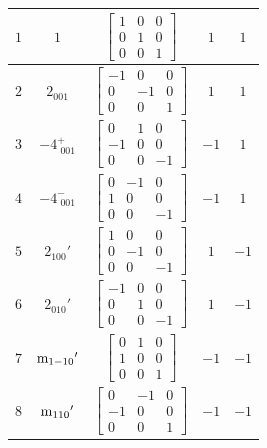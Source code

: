 \documentclass[fleqn,8pt]{jsarticle}
\begin{document}
\begin{longtable}{ccccc}
$ 1 $ & $ 1 $ & $ \begin{bmatrix} 1 & 0 & 0 \\ 0 & 1 & 0 \\ 0 & 0 & 1 \end{bmatrix} $ & $ 1 $ & $ 1 $ \\ \hline
$ 2 $ & $ 2{}_{001} $ & $ \begin{bmatrix} -1 & 0 & 0 \\ 0 & -1 & 0 \\ 0 & 0 & 1 \end{bmatrix} $ & $ 1 $ & $ 1 $ \\ \hline
$ 3 $ & $ -4^{+}_{\,\,001} $ & $ \begin{bmatrix} 0 & 1 & 0 \\ -1 & 0 & 0 \\ 0 & 0 & -1 \end{bmatrix} $ & $ -1 $ & $ 1 $ \\ \hline
$ 4 $ & $ -4^{-}_{\,\,001} $ & $ \begin{bmatrix} 0 & -1 & 0 \\ 1 & 0 & 0 \\ 0 & 0 & -1 \end{bmatrix} $ & $ -1 $ & $ 1 $ \\ \hline
$ 5 $ & $ 2{}_{100}{}' $ & $ \begin{bmatrix} 1 & 0 & 0 \\ 0 & -1 & 0 \\ 0 & 0 & -1 \end{bmatrix} $ & $ 1 $ & $ -1 $ \\ \hline
$ 6 $ & $ 2{}_{010}{}' $ & $ \begin{bmatrix} -1 & 0 & 0 \\ 0 & 1 & 0 \\ 0 & 0 & -1 \end{bmatrix} $ & $ 1 $ & $ -1 $ \\ \hline
$ 7 $ & $ {\rm m}_{1-10}{}' $ & $ \begin{bmatrix} 0 & 1 & 0 \\ 1 & 0 & 0 \\ 0 & 0 & 1 \end{bmatrix} $ & $ -1 $ & $ -1 $ \\ \hline
$ 8 $ & $ {\rm m}_{110}{}' $ & $ \begin{bmatrix} 0 & -1 & 0 \\ -1 & 0 & 0 \\ 0 & 0 & 1 \end{bmatrix} $ & $ -1 $ & $ -1 $ \\
\end{longtable}
\end{document}
